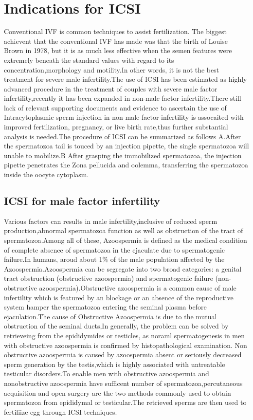 \documentclass[12pt]{article}
\begin{document}
\section{Indications for ICSI}
Conventional IVF is common techniques to assist fertilization. The biggest achievent that the conventional IVF has made was that the birth of Louise Brown in 1978, but it is as much  less effective when the semen features were extremely beneath the standard values with regard to its concentration,morphology and motility.In other words, it is not the best treatment for severe male infertility.The use of ICSI has been estimated as highly advanced procedure in the treatment  of couples with severe male factor infertility,recently it has been expanded in non-male factor infertility.There still lack of relevant supporting documents and evidence to ascertain the use of 
Intracytoplasmic sperm injection in non-male factor infertility is assocaited with improved fertilization, pregnancy, or live birth rate,thus further substantial analysis is needed.The procedure of ICSI can be summarized as follows A.After the  spermatozoa tail is touced by an injection pipette, the single spermatozoa will unable to mobilize.B
After grasping the immobilized spermatozoa, the injection pipette penetrates the Zona pellucida and oolemma, transferring the spermatozoa inside the oocyte cytoplasm.


\subsection{ICSI for male factor infertility}
Various factors can results in male infertility,inclusive of reduced sperm production,abnormal spermatozoa function as well as  obstruction of the tract of spermatozoa.Among all of these, Azoospermia is defined as the medical condition of complete absence of spermatozoa in the ejaculate due to spermatogenic failure.In humans, aroud about 1\% of the male population affected by the Azoospermia.Azoospermia can be segregate into two broad categories: a genital tract obstruction (obstructive azoospermia)  and  spermatogenic failure (non-obstructive azoospermia).Obstructive azoospermia is a common cause of male infertility which is featured by an blockage or an absence of the reproductive system hamper the spermatozoa entering the seminal plasma before ejaculation.The cause of Obstructive Azoospermia is due to the mutual obstruction of the seminal ducts,In generally, the problem can be solved by retrieveing from the epididymides or testicles, as noraml spermatogenesis in men with obstructive azoospermia is confirmed by histopathological examination. Non obstructive azoospermia is caused by azoospermia absent or seriously decreased sperm generation by the testis,which is highly associated with untreatable testicular disorders.To enable men with obstructive azoospermia and nonobstructive azoospermia have sufficent number of spermatozoa,percutaneous acquisition and open surgery are the two methods commonly used to obtain spermatozoa from epididymal or testicular.The retrieved sperms are then used to fertiliize egg through ICSI techniques.
\end{document}
